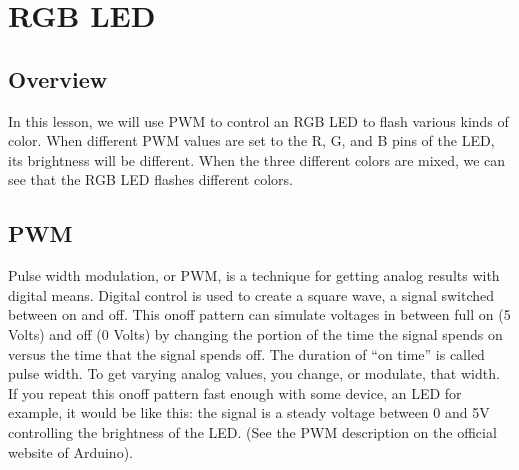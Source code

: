 \documentclass[a4paper,11pt,english]{sphinxmanual}
\begin{document}
\begin{enumerate}
\begin{sphinxVerbatim}[commandchars=\\\{\}]
\end{sphinxVerbatim}

\end{enumerate}

\sphinxstepscope


\section{RGB LED}
\label{\detokenize{Basic_Project/RGB_LED:rgb-led}}\label{\detokenize{Basic_Project/RGB_LED:basic-rgb-led}}\label{\detokenize{Basic_Project/RGB_LED::doc}}

\subsection{Overview}
\label{\detokenize{Basic_Project/RGB_LED:overview}}
\sphinxAtStartPar
In this lesson, we will use PWM to control an RGB LED to flash various kinds of color. When different PWM values are set to the R, G, and B pins of the LED, its brightness will be different. When the three different colors are mixed, we can see that the RGB LED flashes different colors.


\subsection{PWM}
\label{\detokenize{Basic_Project/RGB_LED:pwm}}
\sphinxAtStartPar
Pulse width modulation, or PWM, is a technique for getting analog results with digital means. Digital control is used to create a square wave, a signal switched between on and off. This on\sphinxhyphen{}off pattern can simulate voltages in between full on (5 Volts) and off (0 Volts) by changing the portion of the time the signal spends on versus the time that the signal spends off. The duration of “on time” is called pulse width. To get varying analog values, you change, or modulate, that width. If you repeat this on\sphinxhyphen{}off pattern fast enough with some device, an LED for example, it would be like this: the signal is a steady voltage between 0 and 5V controlling the brightness of the LED. (See the PWM description on the official website of Arduino).
\end{document}
